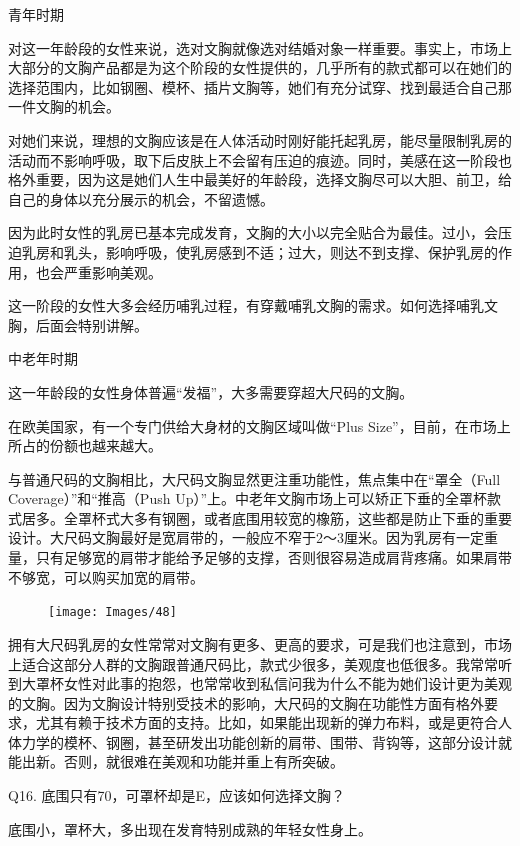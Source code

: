 \documentclass[12pt,UTF8]{ctexbook}
\begin{document}
青年时期

对这一年龄段的女性来说，选对文胸就像选对结婚对象一样重要。事实上，市场上大部分的文胸产品都是为这个阶段的女性提供的，几乎所有的款式都可以在她们的选择范围内，比如钢圈、模杯、插片文胸等，她们有充分试穿、找到最适合自己那一件文胸的机会。

对她们来说，理想的文胸应该是在人体活动时刚好能托起乳房，能尽量限制乳房的活动而不影响呼吸，取下后皮肤上不会留有压迫的痕迹。同时，美感在这一阶段也格外重要，因为这是她们人生中最美好的年龄段，选择文胸尽可以大胆、前卫，给自己的身体以充分展示的机会，不留遗憾。

因为此时女性的乳房已基本完成发育，文胸的大小以完全贴合为最佳。过小，会压迫乳房和乳头，影响呼吸，使乳房感到不适；过大，则达不到支撑、保护乳房的作用，也会严重影响美观。

这一阶段的女性大多会经历哺乳过程，有穿戴哺乳文胸的需求。如何选择哺乳文胸，后面会特别讲解。

中老年时期

这一年龄段的女性身体普遍“发福”，大多需要穿超大尺码的文胸。

在欧美国家，有一个专门供给大身材的文胸区域叫做“Plus Size”，目前，在市场上所占的份额也越来越大。

与普通尺码的文胸相比，大尺码文胸显然更注重功能性，焦点集中在“罩全（Full Coverage）”和“推高（Push Up）”上。中老年文胸市场上可以矫正下垂的全罩杯款式居多。全罩杯式大多有钢圈，或者底围用较宽的橡筋，这些都是防止下垂的重要设计。大尺码文胸最好是宽肩带的，一般应不窄于2～3厘米。因为乳房有一定重量，只有足够宽的肩带才能给予足够的支撑，否则很容易造成肩背疼痛。如果肩带不够宽，可以购买加宽的肩带。

\begin{figure}[htbp]
	\centering
	\texttt{[image: Images/48]}
	\caption{}
	\label{fig:1}
\end{figure}

拥有大尺码乳房的女性常常对文胸有更多、更高的要求，可是我们也注意到，市场上适合这部分人群的文胸跟普通尺码比，款式少很多，美观度也低很多。我常常听到大罩杯女性对此事的抱怨，也常常收到私信问我为什么不能为她们设计更为美观的文胸。因为文胸设计特别受技术的影响，大尺码的文胸在功能性方面有格外要求，尤其有赖于技术方面的支持。比如，如果能出现新的弹力布料，或是更符合人体力学的模杯、钢圈，甚至研发出功能创新的肩带、围带、背钩等，这部分设计就能出新。否则，就很难在美观和功能并重上有所突破。

Q16. 底围只有70，可罩杯却是E，应该如何选择文胸？


底围小，罩杯大，多出现在发育特别成熟的年轻女性身上。
\end{document}
